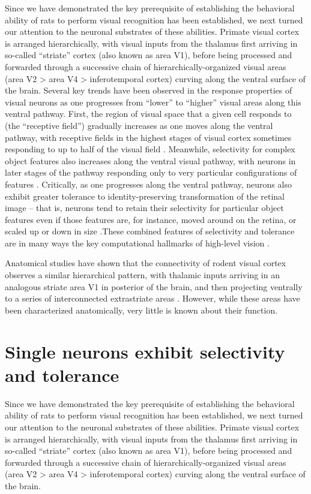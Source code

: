 Since we have demonstrated the key prerequisite of establishing the behavioral ability of rats to perform visual recognition has been established, we next turned our attention to the neuronal substrates of these abilities.  Primate visual cortex is arranged hierarchically, with visual inputs from the thalamus first arriving in so-called ``striate'' cortex (also known as area V1), before being processed and forwarded through a successive chain of hierarchically-organized visual areas (area V2 > area V4 > inferotemporal cortex) curving along the ventral surface of the brain.  
Several key trends have been observed in the response properties of visual neurons as one progresses from ``lower'' to ``higher'' visual areas along this ventral pathway. First, the region of visual space that a given cell responds to (the ``receptive field'') gradually increases as one moves along the ventral pathway, with receptive fields in the highest stages of visual cortex sometimes responding to up to half of the visual field \cite{op2000spatial}. Meanwhile, selectivity for complex object features also increases along the ventral visual pathway, with neurons in later stages of the pathway responding only to very particular configurations of features \cite{Desimone1984, Logothetis1996}.  Critically, as one progresses along the ventral pathway, neurons also exhibit greater tolerance to identity-preserving transformation of the retinal image -- that is, neurons tend to retain their selectivity for particular object features even if those features are, for instance, moved around on the retina, or scaled up or down in size \cite{Ito1995}.These combined features of selectivity and tolerance are in many ways the key computational hallmarks of high-level vision \cite{DiCarlo2007, DiCarlo2012}. 

Anatomical studies have shown that the connectivity of rodent visual cortex observes a similar hierarchical pattern, with thalamic inputs arriving in an analogous striate area V1 in posterior of the brain, and then projecting ventrally to a series of interconnected extrastriate areas  \cite{Coogan1993, ETC}.  However, while these areas have been characterized anatomically, very little is known about their function.



\section{Single neurons exhibit selectivity and tolerance}

Since we have demonstrated the key prerequisite of establishing the behavioral ability of rats to perform visual recognition has been established, we next turned our attention to the neuronal substrates of these abilities.  Primate visual cortex is arranged hierarchically, with visual inputs from the thalamus first arriving in so-called ``striate'' cortex (also known as area V1), before being processed and forwarded through a successive chain of hierarchically-organized visual areas (area V2 > area V4 > inferotemporal cortex) curving along the ventral surface of the brain.  

